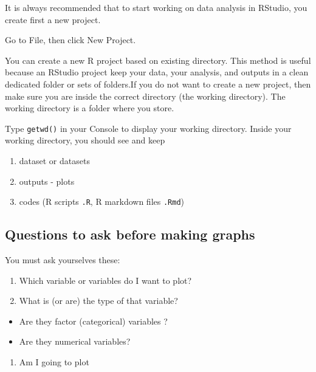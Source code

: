 \documentclass[
]{book}
\providecommand{\tightlist}{%
  \setlength{\itemsep}{0pt}\setlength{\parskip}{0pt}}
\begin{document}
It is always recommended that to start working on data analysis in RStudio, you create first a new project.

Go to File, then click New Project.

You can create a new R project based on existing directory. This method is useful because an RStudio project keep your data, your analysis, and outputs in a clean dedicated folder or sets of folders.If you do not want to create a new project, then make sure you are inside the correct directory (the working directory). The working directory is a folder where you store.

Type \texttt{getwd()} in your Console to display your working directory. Inside your working directory, you should see and keep

\begin{enumerate}
\def\labelenumi{\arabic{enumi}.}
\tightlist
\item
  dataset or datasets
\item
  outputs - plots
\item
  codes (R scripts \texttt{.R}, R markdown files \texttt{.Rmd})
\end{enumerate}

\hypertarget{questions-to-ask-before-making-graphs}{%
\subsection{Questions to ask before making graphs}\label{questions-to-ask-before-making-graphs}}

You must ask yourselves these:

\begin{enumerate}
\def\labelenumi{\arabic{enumi}.}
\tightlist
\item
  Which variable or variables do I want to plot?
\item
  What is (or are) the type of that variable?
\end{enumerate}

\begin{itemize}
\tightlist
\item
  Are they factor (categorical) variables ?
\item
  Are they numerical variables?
\end{itemize}

\begin{enumerate}
\def\labelenumi{\arabic{enumi}.}
\setcounter{enumi}{2}
\tightlist
\item
  Am I going to plot
\end{enumerate}
\end{document}
